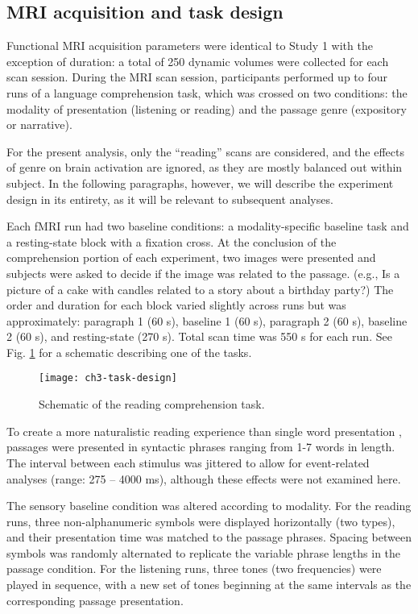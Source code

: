 \subsection{MRI acquisition and task design}

Functional MRI acquisition parameters were identical to Study 1 with the exception of duration: a total of 250 dynamic volumes were collected for each scan session. During the MRI scan session, participants performed up to four runs of a language comprehension task, which was crossed on two conditions: the modality of presentation (listening or reading) and the passage genre (expository or narrative).  

For the present analysis, only the ``reading'' scans are considered, and the effects of genre on brain activation are ignored, as they are mostly balanced out within subject. In the following paragraphs, however, we will describe the experiment design in its entirety, as it will be relevant to subsequent analyses.

Each fMRI run had two baseline conditions: a modality-specific baseline task and a resting-state block with a fixation cross. At the conclusion of the comprehension portion of each experiment, two images were presented and subjects were asked to decide if the image was related to the passage. (e.g., Is a picture of a cake with candles related to a story about a birthday party?) The order and duration for each block varied slightly across runs but was approximately: paragraph 1 (60 s), baseline 1 (60 s), paragraph 2 (60 s), baseline 2 (60 s), and resting-state (270 s). Total scan time was 550 s for each run. See Fig. \ref{fig:ch3-task-design} for a schematic describing one of the tasks.

\begin{figure}[t]
	\centering
	\texttt{[image: ch3-task-design]}
	\caption[Schematic of the reading comprehension task.]{Schematic of the reading comprehension task. }
	\label{fig:ch3-task-design}
\end{figure}

To create a more naturalistic reading experience than single word presentation \citep{Rayner1998}, passages were presented in syntactic phrases ranging from 1-7 words in length. The interval between each stimulus was jittered to allow for event-related analyses (range: 275 – 4000 ms), although these effects were not examined here.

The sensory baseline condition was altered according to modality. For the reading runs, three non-alphanumeric symbols were displayed horizontally (two types), and their presentation time was matched to the passage phrases. Spacing between symbols was randomly alternated to replicate the variable phrase lengths in the passage condition. For the listening runs, three tones (two frequencies) were played in sequence, with a new set of tones beginning at the same intervals as the corresponding passage presentation. 

